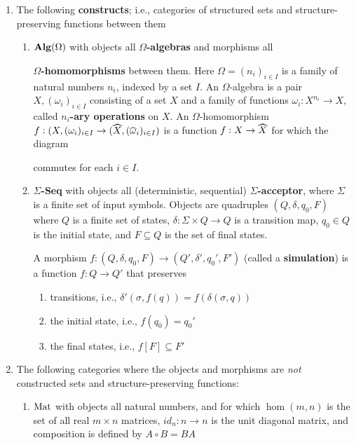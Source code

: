 \documentclass[11pt]{article}
\begin{document}
\begin{examplle}[]
\begin{enumerate}
\item The following \textbf{constructs}; i.e., categories of structured sets and
structure-preserving functions between them
\begin{enumerate}
\item \(\operatorname{\textbf{Alg}}(\Omega)\) with objects all \textbf{\(\Omega\)-algebras} and morphisms all \par
\textbf{\(\Omega\)-homomorphisms} between them. Here \(\Omega=(n_i)_{i\in I}\) is a
family of natural numbers \(n_i\), indexed by a set \(I\). An
\(\Omega\)-algebra is a pair \(X,(\omega_i)_{i\in I}\) consisting of a set
\(X\) and a family of functions \(\omega_i:X^{n_i}\to X\), called \textbf{\(n_i\)-ary
operations} on \(X\). An \(\Omega\)-homomorphism \(f:(X,(\omega_i)_{i\in
         I}\to(\what{X},(\what{\omega}_i)_{i\in I})\) is a function \(f:X\to\what{X}\) for
which the diagram
\begin{center}
\end{center}
commutes for each \(i\in I\).
\item \textbf{\(\Sigma\)-Seq} with objects all (deterministic, sequential)
\textbf{\(\Sigma\)-acceptor}, where \(\Sigma\) is a finite set of input symbols. Objects
are quadruples \((Q,\delta,q_0,F)\) where \(Q\) is a finite set of states, 
\(\delta:\Sigma\times Q\to Q\) is a transition map, \(q_0\in Q\) is the
initial state, and \(F\subseteq Q\) is the set of final states.

A morphism \(f:(Q,\delta,q_0,F)\to(Q',\delta',q_0',F')\) (called a
\textbf{simulation}) is a function \(f:Q\to Q'\) that preserves
\begin{enumerate}
\item transitions, i.e., \(\delta'(\sigma,f(q))=f(\delta(\sigma,q))\)
\item the initial state, i.e., \(f(q_0)=q_0'\)
\item the final states, i.e., \(f[F]\subseteq F'\)
\end{enumerate}
\end{enumerate}
\item The following categories where the objects and morphisms are \emph{not}
constructed sets and structure-preserving functions:
\begin{enumerate}
\item \(\operatorname{Mat}\) with objects all natural numbers, and for which \(\hom(m,n)\) is
the set of all real \(m\times n\) matrices, \(id_n:n\to n\) is the unit
diagonal matrix, and composition is defined by \(A\circ B=BA\)


\end{enumerate}
\end{enumerate}
\end{examplle}
\end{document}
